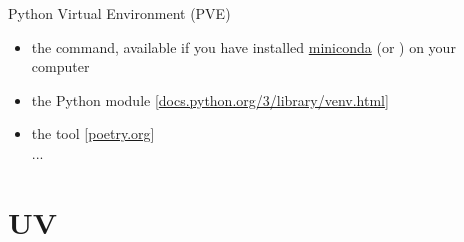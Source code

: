 \documentclass[11pt, serif, mathserif, compress]{beamer}  %
\begin{document}
\begin{frame}{Python Virtual Environment (PVE)}
  \vspace*{-3mm}
  \begin{tcolorbox}[title=Commonly used tools to manage Python project within a PVE, add to width=5mm]
    \begin{itemize}\setlength\itemsep{4mm}
    \item<2-5> the  command, available if you have installed \href{https://www.anaconda.com/docs/getting-started/miniconda/main}{miniconda}
      (or ) on your computer
    \item<3-5> the  Python module \hfill [\href{https://docs.python.org/3/library/venv.html}{\small docs.python.org/3/library/venv.html}]
    \item<4-5> the  tool \hfill [\href{https://python-poetry.org/}{\small poetry.org}]\\
      ...
    \end{itemize}
  \end{tcolorbox}

  
\end{frame}

\section{UV}
\end{document}
